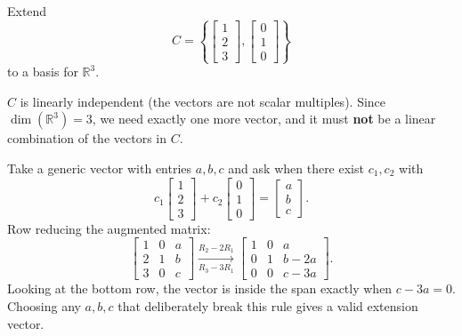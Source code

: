 \begin{example}
Extend
\[
C = \left\{ \begin{bmatrix} 1 \\ 2 \\ 3 \end{bmatrix}, \begin{bmatrix} 0 \\ 1 \\ 0 \end{bmatrix} \right\}
\]
to a basis for $\mathbb{R}^3$.

\begin{solution}
$C$ is linearly independent (the vectors are not scalar multiples). Since $\dim(\mathbb{R}^3) = 3$, we need exactly one more vector, and it must \textbf{not} be a linear combination of the vectors in $C$.

Take a generic vector with entries $a, b, c$ and ask when there exist $c_1, c_2$ with
\[
c_1 \begin{bmatrix} 1 \\ 2 \\ 3 \end{bmatrix} + c_2 \begin{bmatrix} 0 \\ 1 \\ 0 \end{bmatrix} = \begin{bmatrix} a \\ b \\ c \end{bmatrix}.
\]
Row reducing the augmented matrix:
\[
\left[\begin{array}{cc|c}
1 & 0 & a \\
2 & 1 & b \\
3 & 0 & c
\end{array}\right]
\xrightarrow[R_3 - 3R_1]{R_2 - 2R_1}
\left[\begin{array}{cc|c}
1 & 0 & a \\
0 & 1 & b - 2a \\
0 & 0 & c - 3a
\end{array}\right].
\]
Looking at the bottom row, the vector is inside the span exactly when $c - 3a = 0$. Choosing any $a, b, c$ that deliberately break this rule gives a valid extension vector.


\end{solution}
\end{example}
